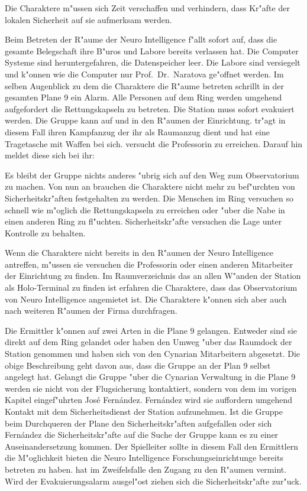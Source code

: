 Die Charaktere m"ussen sich Zeit verschaffen und verhindern, dass Kr"afte der lokalen Sicherheit auf sie aufmerksam werden.

Beim Betreten der R"aume der Neuro Intelligence f"allt sofort auf, dass die gesamte Belegschaft ihre B"uros und Labore bereits verlassen hat. Die Computer Systeme sind heruntergefahren, die Datenspeicher leer. Die Labore sind versiegelt und k"onnen wie die Computer nur Prof.~Dr.~Naratova ge"offnet werden. Im selben Augenblick zu dem die Charaktere die R"aume betreten schrillt in der gesamten Plane 9 ein Alarm. Alle Personen auf dem Ring werden umgehend aufgefordert die Rettungskapseln zu betreten. Die Station muss sofort evakuiert werden.  Die Gruppe kann auf \xl{} und \ml{} in den R"aumen der Einrichtung. \xl{} tr"agt in diesem Fall ihren Kampfanzug der ihr als Raumanzug dient und hat eine Tragetasche mit Waffen bei sich. \ml{} versucht die Professorin zu erreichen. Darauf hin meldet diese sich bei ihr:


Es bleibt der Gruppe nichts anderes "ubrig sich auf den Weg zum Observatorium zu machen. Von nun an brauchen die Charaktere nicht mehr zu bef"urchten von Sicherheitskr"aften festgehalten zu werden. Die Menschen im Ring versuchen so schnell wie m"oglich die Rettungskapseln zu erreichen oder "uber die Nabe in einen anderen Ring zu fl"uchten. Sicherheitskr"afte versuchen die Lage unter Kontrolle zu behalten.

Wenn die Charaktere \ml{} nicht bereits in den R"aumen der Neuro Intelligence antreffen, m"ussen sie versuchen die Professorin oder einen anderen Mitarbeiter der Einrichtung zu finden. Im Raumverzeichnis das an allen W"anden der Station als Holo-Terminal zu finden ist erfahren die Charaktere, dass das Observatorium von Neuro Intelligence angemietet ist. Die Charaktere k"onnen sich aber auch nach weiteren R"aumen der Firma durchfragen.

\begin{remarks}
    Die Ermittler k"onnen auf zwei Arten in die Plane 9 gelangen. Entweder sind sie direkt auf dem Ring gelandet oder haben den Umweg "uber das Raumdock der Station genommen und haben sich von den Cynarian Mitarbeitern abgesetzt. Die obige Beschreibung geht davon aus, dass die Gruppe an der Plan 9 selbst angelegt hat. Gelangt die Gruppe "uber die Cynarian Verwaltung in die Plane 9 werden sie nicht von der Flugsicherung kontaktiert, sondern von dem im vorigen Kapitel eingef"uhrten Jos\'e Fern\'andez. Fern\'andez wird sie auffordern umgehend Kontakt mit dem Sicherheitsdienst der Station aufzunehmen. Ist die Gruppe beim Durchqueren der Plane den Sicherheitskr"aften aufgefallen oder sich Fern\'andez die Sicherheitskr"afte auf die Suche der Gruppe kann es zu einer Auseinandersetzung kommen. Der Spielleiter sollte in diesem Fall den Ermittlern die M"oglichkeit bieten die Neuro Intelligence Forschungseinrichtunge bereits betreten zu haben. \xl{} hat im Zweifelsfalle den Zugang zu den R"aumen vermint. Wird der Evakuierungsalarm ausgel"ost ziehen sich die Sicherheitskr"afte zur"uck.
\end{remarks}
